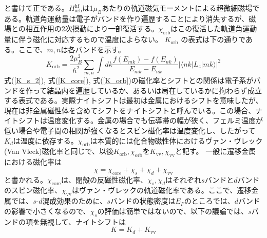 \documentclass[11pt,a4j]{jreport}
\begin{document}
と書けて正である。$H_{\text{orb}}^{\text{hf}}$は1$\mu_B$あたりの軌道磁気モーメントによる超微細磁場である。軌道角運動量は電子がバンドを作り遍歴することにより消失するが、磁場との相互作用の2次摂動により一部復活する。$\chi_{\text{orb}}$はこの復活した軌道角運動量に伴う磁化に対応するもので温度によらない。
$K_{\text{orb}}$ の表式は下の通りである。ここで、$m, n$は各バンドを示す。
\begin{equation}
  K_{\text{orb}} = \frac{2 \mu_B^2}{\hbar^2} \sum_{m,n} \int dk \frac{f(E_{mk}) - f(E_{nk})}{E_{mk} - E_{nk}} \left| \langle nk | L_z | mk \rangle \right|^2
\end{equation}
式(\ref{K_s_2}), 式(\ref{K_core}), 式(\ref{K_orb})の磁化率とシフトとの関係は電子系がバンドを作って結晶内を遍歴しているか、あるいは局在しているかに拘わらず成立する表式である。実際ナイトシフトは最初は金属におけるシフトを意味したが、現在は非金属磁性体を含めてシフトをナイトシフトと呼んでいる。この場合、ナイトシフトは温度変化する。金属の場合でも伝導帯の幅が狭く、フェルミ温度が低い場合や電子間の相関が強くなるとスピン磁化率は温度変化し、したがって$K_d$は温度に依存する。$\chi_{\text{orb}}$は本質的には化合物磁性体におけるヴァン・ヴレック(Van Vleck)磁化率と同じで、以後$K_{\text{orb}}, \chi_{\text{orb}}$を$K_{\text{vv}}, \chi_{\text{vv}}$と記す。
一般に遷移金属における磁化率は
\begin{equation}
  \chi = \chi_{\text{core}} + \chi_s + \chi_d + \chi_{\text{vv}}
\end{equation}
と書かれる。$\chi_{\text{core}}$は、閉殻の反磁性磁化率、$\chi_s, \chi_d$はそれぞれ$s$バンドと$d$バンドのスピン磁化率、$\chi_{\text{vv}}$はヴァン・ヴレックの軌道磁化率である。ここで、遷移金属では、$s$-$d$混成効果のために、$s$バンドの状態密度は$E_F$のところでは、$d$バンドの影響で小さくなるので、$\chi_s$の評価は簡単ではないので、以下の議論では、$s$バンドの項を無視して、ナイトシフトは
\begin{equation}
  K = K_d + K_{\text{vv}}
\end{equation}
\end{document}
